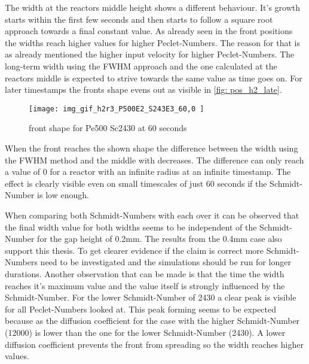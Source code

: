 \documentclass[../thesis.tex]{subfiles}
\begin{document}
The width at the reactors middle height shows a different behaviour. It's growth starts within the first few seconds and then starts to follow a square root approach towards a final constant value. As already seen in the front positions the widths reach higher values for higher Peclet-Numbers. The reason for that is as already mentioned the higher input velocity for higher Peclet-Numbers. The long-term width using the FWHM approach and the one calculated at the reactors middle is expected to strive towards the same value as time goes on. For later timestamps the fronts shape evens out as visible in \autoref{fig: pos_h2_late}.
\begin{figure}[htb]
	\centering
	\texttt{[image: img\_gif\_h2r3\_P500E2\_S243E3\_60,0 ]}
	\caption{front shape for Pe500 Sc2430 at 60 seconds}
	\label{fig: pos_h2_late}
\end{figure}
When the front reaches the shown shape the difference between the width using the FWHM method and the middle with decreases. The difference can only reach a value of 0 for a reactor with an infinite radius at an infinite timestamp. The effect is clearly visible even on small timescales of just 60 seconds if the Schmidt-Number is low enough.

When comparing both Schmidt-Numbers with each over it can be observed that the final width value for both widths seems to be independent of the Schmidt-Number for the gap height of 0.2mm. The results from the 0.4mm case also support this thesis. To get clearer evidence if the claim is correct more Schmidt-Numbers need to be investigated and the simulations should be run for longer durations. Another observation that can be made is that the time the width reaches it's maximum value and the value itself is strongly influenced by the Schmidt-Number. For the lower Schmidt-Number of 2430 a clear peak is visible for all Peclet-Numbers looked at. This peak forming seems to be expected because as the diffusion coefficient for the case with the higher Schmidt-Number (12000) is lower than the one for the lower Schmidt-Number (2430). A lower diffusion coefficient prevents the front from spreading so the width reaches higher values.
\newline
\end{document}
